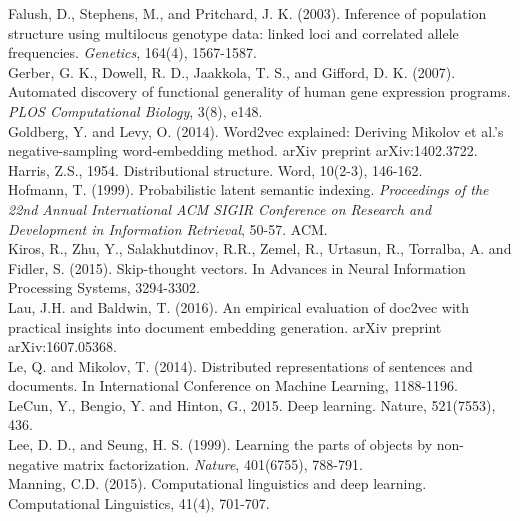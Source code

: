 \documentclass[11pt]{article}
\begin{document}
\newline
Falush, D., Stephens, M., and Pritchard, J. K. (2003). Inference of population structure using multilocus genotype data: linked loci and correlated allele frequencies. \emph{Genetics}, 164(4), 1567-1587. \\
\newline
Gerber, G. K., Dowell, R. D., Jaakkola, T. S., and Gifford, D. K. (2007). Automated discovery of functional generality of human gene expression programs. \emph{PLOS Computational Biology}, 3(8), e148. \\
\newline
Goldberg, Y. and Levy, O. (2014). Word2vec explained: Deriving Mikolov et al.'s negative-sampling word-embedding method. arXiv preprint arXiv:1402.3722.
Harris, Z.S., 1954. Distributional structure. Word, 10(2-3), 146-162.\\
\newline
Hofmann, T. (1999). Probabilistic latent semantic indexing. \emph{Proceedings of the 22nd Annual International ACM SIGIR Conference on Research and Development in Information Retrieval}, 50-57. ACM.\\
\newline
Kiros, R., Zhu, Y., Salakhutdinov, R.R., Zemel, R., Urtasun, R., Torralba, A. and Fidler, S. (2015). Skip-thought vectors. In Advances in Neural Information Processing Systems, 3294-3302.\\
\newline
Lau, J.H. and Baldwin, T. (2016). An empirical evaluation of doc2vec with practical insights into document embedding generation. arXiv preprint arXiv:1607.05368.\\
\newline
Le, Q. and Mikolov, T. (2014). Distributed representations of sentences and documents. In International Conference on Machine Learning, 1188-1196.\\
\newline
LeCun, Y., Bengio, Y. and Hinton, G., 2015. Deep learning. Nature, 521(7553), 436.\\
\newline
Lee, D. D., and Seung, H. S. (1999). Learning the parts of objects by non-negative matrix factorization. \emph{Nature}, 401(6755), 788-791.\\
\newline
Manning, C.D. (2015). Computational linguistics and deep learning. Computational Linguistics, 41(4), 701-707. \\
\newline
\end{document}
